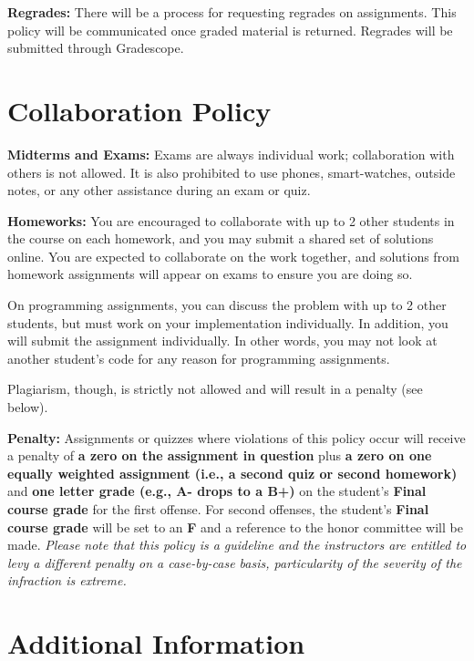 \documentclass[12pt]{article}
\begin{document}
\textbf{Regrades:} There will be a process for requesting regrades on assignments. This policy will be communicated once graded material is returned. Regrades will be submitted through Gradescope.

\section*{Collaboration Policy}

\textbf{Midterms and Exams:} Exams are always individual work; collaboration with others is not allowed. It is also prohibited to use phones, smart-watches, outside notes, or any other assistance during an exam or quiz.

\textbf{Homeworks:} You are encouraged to collaborate with up to 2 other students in the course on each homework, and you may submit a shared set of solutions online. You are expected to collaborate on the work together, and solutions from homework assignments will appear on exams to ensure you are doing so.

On programming assignments, you can discuss the problem with up to 2 other students, but must work on your implementation individually. In addition, you will submit the assignment individually. In other words, you may not look at another student's code for any reason for programming assignments.

Plagiarism, though, is strictly not allowed and will result in a penalty (see below).

\textbf{Penalty:} Assignments or quizzes where violations of this policy occur will receive a penalty of \textbf{a zero on the assignment in question} plus \textbf{a zero on one equally weighted assignment (i.e., a second quiz or second homework)} and \textbf{one letter grade (e.g., A- drops to a B+)} on the student's \textbf{Final course grade} for the first offense. For second offenses, the student's \textbf{Final course grade} will be set to an \textbf{F} and a reference to the honor committee will be made. \emph{Please note that this policy is a guideline and the instructors are entitled to levy a different penalty on a case-by-case basis, particularity of the severity of the infraction is extreme.}

\section*{Additional Information}

\end{document}
